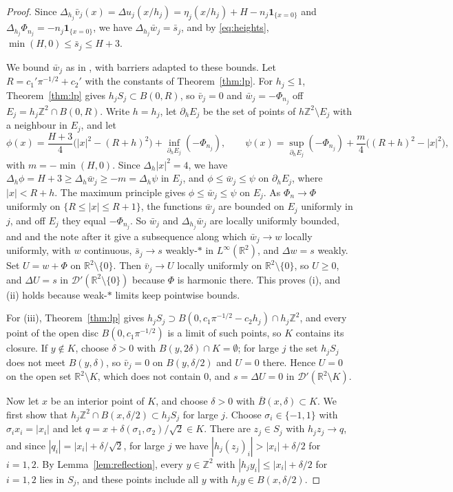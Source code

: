 \documentclass[11pt]{amsart}
\theoremstyle{remark}
\numberwithin{equation}{section}
\newcommand{\Z}{\mathbb Z}
\newcommand{\R}{\mathbb R}
\newcommand{\D}{\mathcal D}
\begin{document}
\begin{proof}
Since $\Delta_{h_j}\bar v_j(x)=\Delta u_j(x/h_j)=\eta_j(x/h_j)+H-n_j\mathbf 1_{\{x=0\}}$ and $\Delta_{h_j}\Phi_{n_j}=-n_j\mathbf 1_{\{x=0\}}$, we have $\Delta_{h_j}\bar w_j=\bar s_j$, and by \eqref{eq:heights}, $\min(H,0)\le\bar s_j\le H+3$.

We bound $\bar w_j$ as in \cite[Lemma~3.1]{PS}, with barriers adapted to these bounds. Let $R=c_1'\pi^{-1/2}+c_2'$ with the constants of Theorem~\ref{thm:lp}. For $h_j\le1$, Theorem~\ref{thm:lp} gives $h_jS_j\subset B(0,R)$, so $\bar v_j=0$ and $\bar w_j=-\Phi_{n_j}$ off $E_j=h_j\Z^2\cap B(0,R)$. Write $h=h_j$, let $\partial_hE_j$ be the set of points of $h\Z^2\setminus E_j$ with a neighbour in $E_j$, and let
\[
\phi(x)=\frac{H+3}4\bigl(|x|^2-(R+h)^2\bigr)+\inf_{\partial_hE_j}(-\Phi_{n_j}),\qquad\psi(x)=\sup_{\partial_hE_j}(-\Phi_{n_j})+\frac{m}4\bigl((R+h)^2-|x|^2\bigr),
\]
with $m=-\min(H,0)$. Since $\Delta_h|x|^2=4$, we have $\Delta_h\phi=H+3\ge\Delta_h\bar w_j\ge-m=\Delta_h\psi$ in $E_j$, and $\phi\le\bar w_j\le\psi$ on $\partial_hE_j$, where $|x|<R+h$. The maximum principle \cite[Proposition~2.2]{PS} gives $\phi\le\bar w_j\le\psi$ on $E_j$. As $\Phi_n\to\Phi$ uniformly on $\{R\le|x|\le R+1\}$, the functions $\bar w_j$ are bounded on $E_j$ uniformly in $j$, and off $E_j$ they equal $-\Phi_{n_j}$. So $\bar w_j$ and $\Delta_{h_j}\bar w_j$ are locally uniformly bounded, and \cite[Lemma~3.1]{PS} and the note after it give a subsequence along which $\bar w_j\to w$ locally uniformly, with $w$ continuous, $\bar s_j\to s$ weakly-$*$ in $L^\infty(\R^2)$, and $\Delta w=s$ weakly. Set $U=w+\Phi$ on $\R^2\setminus\{0\}$. Then $\bar v_j\to U$ locally uniformly on $\R^2\setminus\{0\}$, so $U\ge0$, and $\Delta U=s$ in $\D'(\R^2\setminus\{0\})$ because $\Phi$ is harmonic there. This proves (i), and (ii) holds because weak-$*$ limits keep pointwise bounds.

For (iii), Theorem~\ref{thm:lp} gives $h_jS_j\supset B(0,c_1\pi^{-1/2}-c_2h_j)\cap h_j\Z^2$, and every point of the open disc $B(0,c_1\pi^{-1/2})$ is a limit of such points, so $K$ contains its closure. If $y\notin K$, choose $\delta>0$ with $B(y,2\delta)\cap K=\emptyset$; for large $j$ the set $h_jS_j$ does not meet $B(y,\delta)$, so $\bar v_j=0$ on $B(y,\delta/2)$ and $U=0$ there. Hence $U=0$ on the open set $\R^2\setminus K$, which does not contain $0$, and $s=\Delta U=0$ in $\D'(\R^2\setminus K)$.

Now let $x$ be an interior point of $K$, and choose $\delta>0$ with $\overline{B}(x,\delta)\subset K$. We first show that $h_j\Z^2\cap B(x,\delta/2)\subset h_jS_j$ for large $j$. Choose $\sigma_i\in\{-1,1\}$ with $\sigma_ix_i=|x_i|$ and let $q=x+\delta(\sigma_1,\sigma_2)/\sqrt2\in K$. There are $z_j\in S_j$ with $h_jz_j\to q$, and since $|q_i|=|x_i|+\delta/\sqrt2$, for large $j$ we have $|h_j(z_j)_i|>|x_i|+\delta/2$ for $i=1,2$. By Lemma~\ref{lem:reflection}, every $y\in\Z^2$ with $|h_jy_i|\le|x_i|+\delta/2$ for $i=1,2$ lies in $S_j$, and these points include all $y$ with $h_jy\in B(x,\delta/2)$.


\end{proof}
\end{document}
